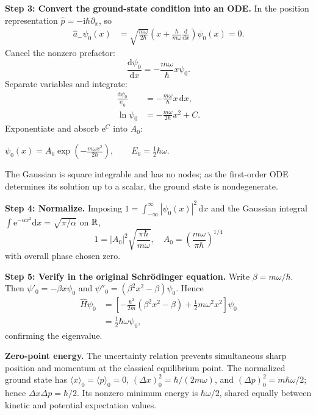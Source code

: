 \documentclass[11pt,a4paper]{article}
\newcommand{\key}[1]{\begin{resultbox}\centering\(\displaystyle #1\)\end{resultbox}}
\newcommand{\dd}{\mathrm{d}}\newcommand{\iu}{\mathrm{i}}\newcommand{\ee}{\mathrm{e}}
\newcommand{\avg}[1]{\langle #1\rangle}\newcommand{\Sch}{Schr\"odinger}
\begin{document}
\textbf{Step 3: Convert the ground-state condition into an ODE.} In the position representation \(\hat p=-\iu\hbar\partial_x\), so
\begin{align}
\hat a_-\psi_0(x)&=\sqrt{\frac{m\omega}{2\hbar}}\left(x+\frac{\hbar}{m\omega}\frac{\dd}{\dd x}\right)\psi_0(x)=0.
\end{align}
Cancel the nonzero prefactor:
\begin{equation}\boxed{\frac{\dd\psi_0}{\dd x}=-\frac{m\omega}{\hbar}x\psi_0.}\end{equation}
Separate variables and integrate:
\begin{align}
\frac{\dd\psi_0}{\psi_0}&=-\frac{m\omega}{\hbar}x\,\dd x,\\
\ln\psi_0&=-\frac{m\omega}{2\hbar}x^2+C.
\end{align}
Exponentiate and absorb \(\ee^C\) into \(A_0\):
\key{\boxed{\psi_0(x)=A_0\exp\!\left(-\frac{m\omega x^2}{2\hbar}\right),\qquad E_0=\frac12\hbar\omega.}}
The Gaussian is square integrable and has no nodes; as the first-order ODE determines its solution up to a scalar, the ground state is nondegenerate.

\textbf{Step 4: Normalize.} Imposing \(1=\int_{-\infty}^{\infty}|\psi_0(x)|^2\,\dd x\) and the Gaussian integral \(\int\ee^{-\alpha x^2}\dd x=\sqrt{\pi/\alpha}\) on \(\mathbb R\),
\begin{equation}1=|A_0|^2\sqrt{\frac{\pi\hbar}{m\omega}},\quad
\boxed{A_0=\left(\frac{m\omega}{\pi\hbar}\right)^{1/4}}\end{equation}
with overall phase chosen zero.

\textbf{Step 5: Verify in the original Schr\"odinger equation.} Write \(\beta=m\omega/\hbar\). Then \(\psi'_0=-\beta x\psi_0\) and \(\psi''_0=(\beta^2x^2-\beta)\psi_0\). Hence
\begin{align}
\hat H\psi_0&=\left[-\frac{\hbar^2}{2m}(\beta^2x^2-\beta)+\frac12m\omega^2x^2\right]\psi_0\\
&=\frac12\hbar\omega\psi_0,
\end{align}
confirming the eigenvalue.

\textbf{Zero-point energy.} The uncertainty relation prevents simultaneous sharp position and momentum at the classical equilibrium point. The normalized ground state has \(\avg{x}_0=\avg p_0=0\), \((\Delta x)^2_0=\hbar/(2m\omega)\), and \((\Delta p)^2_0=m\hbar\omega/2\); hence \(\Delta x\Delta p=\hbar/2\). Its nonzero minimum energy is \(\hbar\omega/2\), shared equally between kinetic and potential expectation values.
\end{document}
